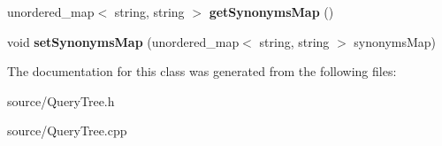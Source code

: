 \begin{DoxyCompactItemize}
\item 
\hypertarget{class_query_tree_ae90030dd0bbc85757c38bec529258ad8}{}unordered\+\_\+map$<$ string, string $>$ {\bfseries get\+Synonyms\+Map} ()\label{class_query_tree_ae90030dd0bbc85757c38bec529258ad8}

\item 
\hypertarget{class_query_tree_a04fd2f5937ce1781d884432592cea7ef}{}void {\bfseries set\+Synonyms\+Map} (unordered\+\_\+map$<$ string, string $>$ synonyms\+Map)\label{class_query_tree_a04fd2f5937ce1781d884432592cea7ef}

\end{DoxyCompactItemize}


The documentation for this class was generated from the following files\+:\begin{DoxyCompactItemize}
\item 
source/Query\+Tree.\+h\item 
source/Query\+Tree.\+cpp\end{DoxyCompactItemize}
